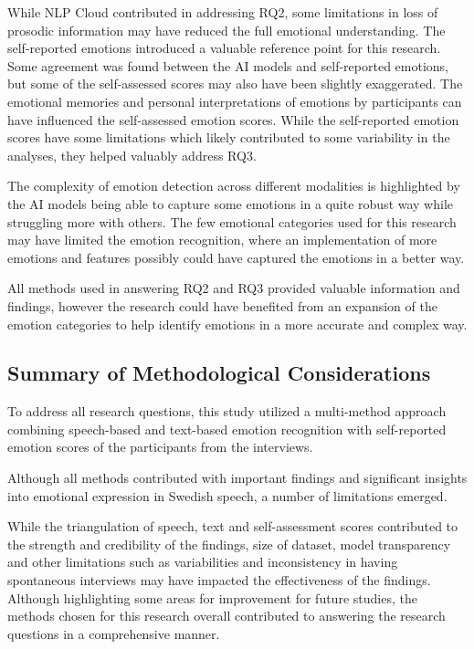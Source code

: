 While NLP Cloud contributed in addressing RQ2, some limitations in loss of prosodic information may have reduced the full emotional understanding.
The self-reported emotions introduced a valuable reference point for this research. Some agreement was found between the AI models and self-reported emotions, but some of the self-assessed scores may also have been slightly exaggerated. The emotional memories and personal interpretations of emotions by participants can have influenced the self-assessed emotion scores.
While the self-reported emotion scores have some limitations which likely contributed to some variability in the analyses, they helped valuably address RQ3.

The complexity of emotion detection across different modalities is highlighted by the AI models being able to capture some emotions in a quite robust way while struggling more with others. The few emotional categories used for this research may have limited the emotion recognition, where an implementation of more emotions and features possibly could have captured the emotions in a better way.

All methods used in answering RQ2 and RQ3 provided valuable information and findings, however the research could have benefited from an expansion of the emotion categories to help identify emotions in a more accurate and complex way.

\subsection{Summary of Methodological Considerations}
To address all research questions, this study utilized a multi-method approach combining speech-based and text-based emotion recognition with self-reported emotion scores of the participants from the interviews. 

Although all methods contributed with important findings and significant insights into emotional expression in Swedish speech, a number of limitations emerged.

While the triangulation of speech, text and self-assessment scores contributed to the strength and credibility of the findings, size of dataset, model transparency and other limitations such as variabilities and inconsistency in having spontaneous interviews may have impacted the effectiveness of the findings. Although highlighting some areas for improvement for future studies, the methods chosen for this research overall contributed to answering the research questions in a comprehensive manner.
